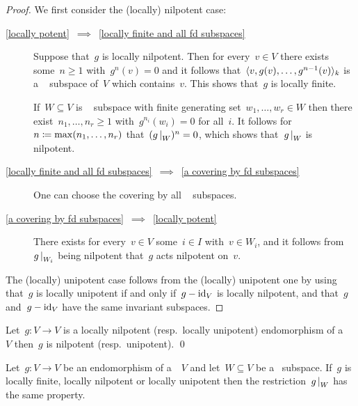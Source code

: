 \begin{proof}
  \label{characterization of locally potent endomorphisms}
  We first consider the (locally) nilpotent case:
  \begin{description}
    \item[\ref*{locally potent}~$\implies$~\ref*{locally finite and all fd subspaces}]
      Suppose that~$g$ is locally nilpotent.
      Then for every~$v \in V$ there exists some~$n \geq 1$ with~$g^n(v) = 0$ and it follows that~$\langle v, g(v), \dotsc, g^{n-1}(v) \rangle_k$ is a {\fd}~ subspace of~$V$ which contains~$v$.
      This shows that~$g$ is locally finite.
      
      If~$W \subseteq V$ is {\fd}~ subspace with finite generating set~$w_1, \dotsc, w_r \in W$ then there exist~$n_1, \dotsc, n_r \geq 1$ with~$g^{n_i}(w_i) = 0$ for all~$i$. It follows for~$n \coloneqq \max(n_1, \dotsc, n_r)$ that~$(\restrict{g}{W})^n = 0$, which shows that~$\restrict{g}{W}$ is nilpotent.
    \item[\ref*{locally finite and all fd subspaces}~$\implies$~\ref*{a covering by fd subspaces}]
      One can choose the covering by all {\fd}~ subspaces.
    \item[\ref*{a covering by fd subspaces}~$\implies$~\ref*{locally potent}]
      There exists for every~$v \in V$ some~$i \in I$ with~$v \in W_i$, and it follows from~$\restrict{g}{W_i}$ being nilpotent that~$g$ acts nilpotent on~$v$.
  \end{description}
  The (locally) unipotent case follows from the (locally) unipotent one by using that~$g$ is locally unipotent if and only if~$g - \operatorname{id}_V$ is locally nilpotent, and that~$g$ and~$g - \operatorname{id}_V$ have the same invariant subspaces.
\end{proof}


\begin{corollary}
  Let~$g \colon V \to V$ is a locally nilpotent (resp.\ locally unipotent) endomorphism of a {\fd}~{\kvs}~$V$ then~$g$ is nilpotent (resp.\ unipotent).
  \qed
\end{corollary}


\begin{lemma}
  \label{restriction of ss and locally potent endomorphisms }
  Let~$g \colon V \to V$ be an endomorphism of a~{\kvs}~$V$ and let~$W \subseteq V$ be a~ subspace.
  If~$g$ is locally finite, locally nilpotent or locally unipotent then the restriction~$\restrict{g}{W}$ has the same property.
\end{lemma}


